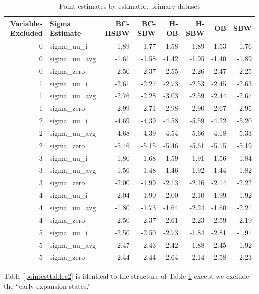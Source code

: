 \documentclass[12pt]{article}
\begin{document}
\begin{table}[ht]
\centering
\begin{tabular}{rlrrrrrr}
  \hline
Variables Excluded & Sigma Estimate & BC-HSBW & BC-SBW & H-OB & H-SBW & OB & SBW \\ 
  \hline
0 & sigma\_uu\_i & -1.89 & -1.77 & -1.58 & -1.89 & -1.53 & -1.76 \\ 
  0 & sigma\_uu\_avg & -1.61 & -1.58 & -1.42 & -1.95 & -1.40 & -1.89 \\ 
  0 & sigma\_zero & -2.50 & -2.37 & -2.55 & -2.26 & -2.47 & -2.25 \\ 
  1 & sigma\_uu\_i & -2.61 & -2.27 & -2.73 & -2.53 & -2.45 & -2.63 \\ 
  1 & sigma\_uu\_avg & -2.76 & -2.28 & -3.03 & -2.59 & -2.44 & -2.67 \\ 
  1 & sigma\_zero & -2.99 & -2.71 & -2.98 & -2.90 & -2.67 & -2.95 \\ 
  2 & sigma\_uu\_i & -4.69 & -4.39 & -4.58 & -5.59 & -4.22 & -5.20 \\ 
  2 & sigma\_uu\_avg & -4.68 & -4.39 & -4.54 & -5.66 & -4.18 & -5.33 \\ 
  2 & sigma\_zero & -5.46 & -5.15 & -5.46 & -5.61 & -5.15 & -5.19 \\ 
  3 & sigma\_uu\_i & -1.80 & -1.68 & -1.59 & -1.91 & -1.56 & -1.84 \\ 
  3 & sigma\_uu\_avg & -1.56 & -1.48 & -1.46 & -1.92 & -1.44 & -1.82 \\ 
  3 & sigma\_zero & -2.00 & -1.99 & -2.13 & -2.16 & -2.14 & -2.22 \\ 
  4 & sigma\_uu\_i & -2.04 & -1.90 & -2.00 & -2.10 & -1.99 & -1.92 \\ 
  4 & sigma\_uu\_avg & -1.80 & -1.73 & -1.64 & -2.24 & -1.60 & -2.21 \\ 
  4 & sigma\_zero & -2.50 & -2.37 & -2.61 & -2.23 & -2.59 & -2.19 \\ 
  5 & sigma\_uu\_i & -2.50 & -2.50 & -2.73 & -1.84 & -2.81 & -1.91 \\ 
  5 & sigma\_uu\_avg & -2.47 & -2.43 & -2.42 & -1.88 & -2.45 & -1.92 \\ 
  5 & sigma\_zero & -2.44 & -2.44 & -2.64 & -2.14 & -2.58 & -2.23 \\ 
   \hline
\end{tabular}
\label{pointesttable}
\caption{Point estimates by estimator, primary dataset}
\end{table}

Table \ref{pointesttablec2} is identical to the structure of Table \ref{pointesttable} except we exclude the ``early expansion states.''
\end{document}

